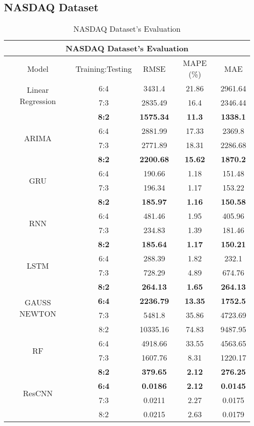 \documentclass{ieeeojies}
\begin{document}
\subsection{NASDAQ Dataset} 
\begin{table}[H]
    \centering
    \caption{NASDAQ Dataset's Evaluation}
    \begin{tabular}{|c|c|c|c|c|}
         \hline
         \multicolumn{5}{|c|}{\textbf{NASDAQ Dataset's Evaluation}}\\
         \hline
         \centering Model & Training:Testing & RMSE & MAPE (\%) & MAE\\
         \hline
         \multirow{2}{*}{Linear Regression} & 6:4 & 3431.4 & 21.86 & 2961.64 \\ & 7:3 & 2835.49 & 16.4 & 2346.44 \\ & \textbf{8:2} & \textbf{1575.34} & \textbf{11.3} & \textbf{1338.1}\\
         \hline
         \multirow{2}{*}{ARIMA} & 6:4 & 2881.99 & 17.33 & 2369.8 \\ & 7:3 & 2771.89 & 18.31 & 2286.68 \\ & \textbf{8:2} & \textbf{2200.68} & \textbf{15.62} & \textbf{1870.2}\\
         \hline
         \multirow{2}{*}{GRU} & 6:4 & 190.66 & 1.18 & 151.48 \\ & 7:3 & 196.34 & 1.17 & 153.22 \\ & \textbf{8:2} & \textbf{185.97} & \textbf{1.16} & \textbf{150.58}\\
         \hline
         \multirow{2}{*}{RNN} & 6:4 & 481.46 & 1.95 & 405.96 \\ & 7:3 & 234.83 & 1.39 & 181.46 \\ & \textbf{8:2} & \textbf{185.64} & \textbf{1.17} & \textbf{150.21}\\
         \hline
         \multirow{2}{*}{LSTM} & 6:4 & 288.39 & 1.82 & 232.1 \\ & 7:3 & 728.29 & 4.89 & 674.76 \\ & \textbf{8:2} & \textbf{264.13} & \textbf{1.65} & \textbf{264.13}\\
         \hline
         \multirow{2}{*}{GAUSS NEWTON} & \textbf{6:4} & \textbf{2236.79} & \textbf{13.35} & \textbf{1752.5}\\ & 7:3 & 5481.8 & 35.86 & 4723.69 \\ & 8:2 & 10335.16	& 74.83 & 9487.95 \\
         \hline
         \multirow{2}{*}{RF} & 6:4 & 4918.66 & 33.55 & 4563.65 \\ & 7:3 & 1607.76 & 8.31 & 1220.17 \\ & \textbf{8:2} &  	\textbf{379.65} &	\textbf{2.12} & 	\textbf{276.25} \\
         \hline
        \multirow{2}{*}{ResCNN} & \textbf{6:4} & \textbf{0.0186} & \textbf{2.12} & \textbf{0.0145}\\ & 7:3 & 0.0211 & 2.27 & 0.0175 \\ & 8:2 & 0.0215	& 2.63 & 0.0179 \\
         \hline
    \end{tabular}
    \label{nasdaqresult}
\end{table}
\end{document}
